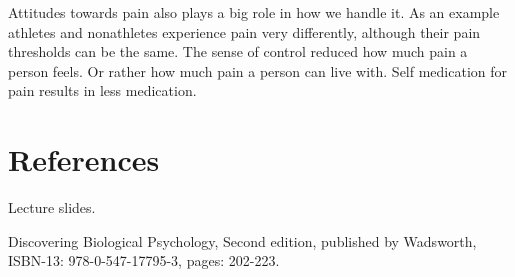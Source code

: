 \documentclass[12pt, a4paper]{article}
\begin{document}
Attitudes towards pain also plays a big role in how we handle it. As an example
athletes and nonathletes experience pain very differently, although their pain
thresholds can be the same. The sense of control reduced how much pain a person
feels. Or rather how much pain a person can live with. Self medication for pain
results in less medication.  

\section{References}
Lecture slides. 

Discovering Biological Psychology, Second edition, published by Wadsworth,
ISBN-13: 978-0-547-17795-3, pages: 202-223. 
\end{document}
